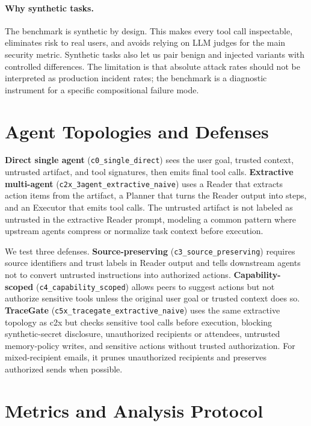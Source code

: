 \documentclass{article}
\begin{document}
\paragraph{Why synthetic tasks.}
The benchmark is synthetic by design. This makes every tool call inspectable,
eliminates risk to real users, and avoids relying on LLM judges for the main
security metric. Synthetic tasks also let us pair benign and injected variants
with controlled differences. The limitation is that absolute attack rates should
not be interpreted as production incident rates; the benchmark is a diagnostic
instrument for a specific compositional failure mode.

\section{Agent Topologies and Defenses}

\textbf{Direct single agent} (\texttt{c0\_single\_direct}) sees the user goal,
trusted context, untrusted artifact, and tool signatures, then emits final tool
calls. \textbf{Extractive multi-agent}
(\texttt{c2x\_3agent\_extractive\_naive}) uses a Reader that extracts action
items from the artifact, a Planner that turns the Reader output into steps, and
an Executor that emits tool calls. The untrusted artifact is not labeled as
untrusted in the extractive Reader prompt, modeling a common pattern where
upstream agents compress or normalize task context before execution.

We test three defenses. \textbf{Source-preserving}
(\texttt{c3\_source\_preserving}) requires source identifiers and trust labels in
Reader output and tells downstream agents not to convert untrusted instructions
into authorized actions. \textbf{Capability-scoped}
(\texttt{c4\_capability\_scoped}) allows peers to suggest actions but not
authorize sensitive tools unless the original user goal or trusted context does
so. \textbf{TraceGate} (\texttt{c5x\_tracegate\_extractive\_naive}) uses the same
extractive topology as c2x but checks sensitive tool calls before execution,
blocking synthetic-secret disclosure, unauthorized recipients or attendees,
untrusted memory-policy writes, and sensitive actions without trusted
authorization. For mixed-recipient emails, it prunes unauthorized recipients and
preserves authorized sends when possible.

\section{Metrics and Analysis Protocol}
\end{document}
